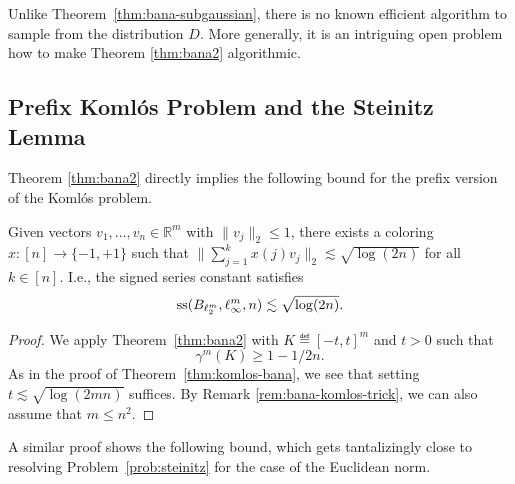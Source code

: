 Unlike Theorem~\ref{thm:bana-subgaussian}, there is no known efficient
algorithm to sample from the distribution $D$. More generally, it is
an intriguing open problem how to make Theorem \ref{thm:bana2}
algorithmic. 

\subsection{Prefix Koml\'os Problem and the Steinitz Lemma}
Theorem \ref{thm:bana2} directly implies the following bound for the prefix version of the Koml\'os problem.

\begin{theorem}\label{thm:prefix-komlos}
  Given vectors $v_1,\dots,v_n\in\mathbb{R}^m$ with $\|v_j\|_2 \leq 1$, 
  there exists a coloring $x:[n]\to\{-1,+1\}$ such that  $\|\sum_{j=1}^k x(j) v_j\|_2 \lesssim \sqrt{\log(2n)}$ for all $k\in [n]$. I.e., the signed series constant satisfies 
  \[
  \operatorname{ss}(B_{\ell_2^m},\ell_\infty^m,n) \lesssim \sqrt{\log(2n)}.
  \]
\end{theorem}
\begin{proof}
We apply Theorem~\ref{thm:bana2} with $K \eqdef [-t,t]^m$ and $t>0$ such
that  \[\gamma^m(K) \geq 1-1/2n.\]  As in the proof of
Theorem~\ref{thm:komlos-bana}, we see that setting $t \lesssim \sqrt{\log(2mn)}$ suffices.
By Remark \ref{rem:bana-komlos-trick}, we can also assume that $m\leq n^2$.
\end{proof}

A similar proof shows the following bound, which gets tantalizingly
close to resolving Problem~\ref{prob:steinitz} for the case of the
Euclidean norm.

